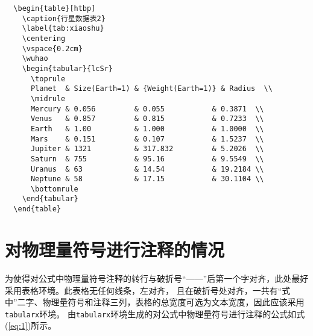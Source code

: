 \begin{lstlisting}
  \begin{table}[htbp]
    \caption{行星数据表2}
    \label{tab:xiaoshu}
    \centering
    \vspace{0.2cm}
    \wuhao
    \begin{tabular}{lcSr}
      \toprule
      Planet  & Size(Earth=1) & {Weight(Earth=1)} & Radius  \\
      \midrule
      Mercury & 0.056         & 0.055           & 0.3871  \\
      Venus   & 0.857         & 0.815           & 0.7233  \\
      Earth   & 1.00          & 1.000           & 1.0000  \\
      Mars    & 0.151         & 0.107           & 1.5237  \\
      Jupiter & 1321          & 317.832         & 5.2026  \\
      Saturn  & 755           & 95.16           & 9.5549  \\
      Uranus  & 63            & 14.54           & 19.2184 \\
      Neptune & 58            & 17.15           & 30.1104 \\
      \bottomrule
    \end{tabular}
  \end{table}
\end{lstlisting}

\section{对物理量符号进行注释的情况}

为使得对公式中物理量符号注释的转行与破折号“——”后第一个字对齐，此处最好采用表格环境。此表格无任何线条，左对齐，
且在破折号处对齐，一共有“式中”二字、物理量符号和注释三列，表格的总宽度可选为文本宽度，因此应该采用\verb|tabularx|环境。
由\verb|tabularx|环境生成的对公式中物理量符号进行注释的公式如式(\ref{eq:1})所示。

